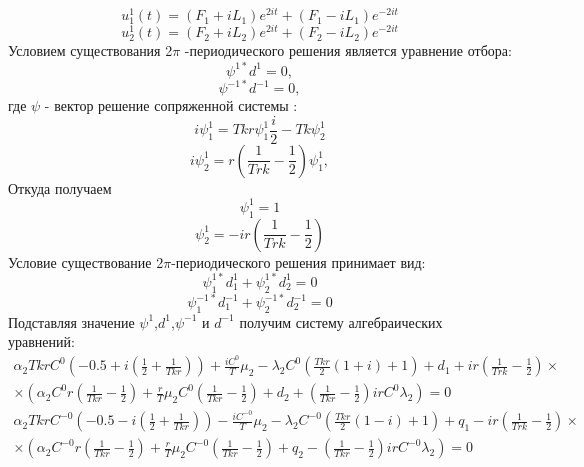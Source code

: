 \documentclass[12pt]{article}
\begin{document}
\begin{equation*}
    u_1^1(t)=(F_1+i L_1)e^{2 i t} + (F_1 -i L_1)e^{-2 i t}
\end{equation*}
\begin{equation*}
    u_2^1(t)=(F_2+i L_2)e^{2 i t} + (F_2 -i L_2)e^{-2 i t}
\end{equation*}
Условием существования 2$\pi$ -периодического решения является уравнение отбора:
\begin{equation*}
    \psi^{1*} d^1 =0,
\end{equation*}
\begin{equation*}
    \psi^{-1*} d^{-1} =0,
\end{equation*}
где $\psi$ - вектор решение сопряженной системы  :
 \begin{equation*}
     i \psi_1^1=T k r \psi_1^1 \frac{i}{2}- T k \psi_2^1
 \end{equation*}
 \begin{equation*}
     i \psi_2^1=r \left(  \frac{1}{T r k} - \frac{1}{2}\right) \psi_1^1 ,
 \end{equation*}
 Откуда получаем
 \begin{equation*}
     \psi_1^1 =1
 \end{equation*}
 \begin{equation*}
     \psi_2^1=-i r \left(  \frac{1}{T r k} - \frac{1}{2}\right)
 \end{equation*}
Условие существование 2$\pi$-периодического решения принимает вид:
\begin{equation}
    \psi_1^{1*} d^1_1+\psi_2^{1*} d^1_2 =0
\end{equation}
\begin{equation*}
    \psi_1^{-1*} d^{-1}_1+\psi_2^{-1*} d^{-1}_2 =0
\end{equation*}
Подставляя значение $\psi^1$,$d^1$,$\psi^{-1}$ и $d^{-1}$ получим систему алгебраических уравнений:
\begin{multline*}
  \alpha_2 T k r C^0 \left ( -0.5+i(\frac{1}{2}+\frac{1}{T k r}) \right)+\frac{i C^0}{T} \mu_2 - \lambda_2 C^0 (\frac{T k r}{2} (1+i) +1)+d_1 +i r \left(  \frac{1}{T r k} - \frac{1}{2}\right)\times\\ \times(\alpha_2 C^0 r \left ( \frac{1}{T k r}-\frac{1}{2} \right)+\frac{r}{T} \mu_2 C^0 \left ( \frac{1}{T k r}-\frac{1}{2} \right)+d_2 +\left ( \frac{1}{T k r}-\frac{1}{2} \right)i r C^0 \lambda_2)  =0
\end{multline*}
\begin{multline*}
 \alpha_2 T k r C^{-0} \left ( -0.5-i(\frac{1}{2}+\frac{1}{T k r}) \right)-\frac{i C^{-0}}{T} \mu_2 - \lambda_2 C^{-0} (\frac{T k r}{2} (1-i) +1)+q_1 -i r \left(  \frac{1}{T r k} - \frac{1}{2}\right)\times \\ \times (\alpha_2 C^{-0} r \left ( \frac{1}{T k r}-\frac{1}{2} \right)+\frac{r}{T} \mu_2 C^{-0} \left ( \frac{1}{T k r}-\frac{1}{2} \right)+q_2 -\left ( \frac{1}{T k r}-\frac{1}{2} \right)i r C^{-0} \lambda_2)  =0
\end{multline*}
\end{document}
